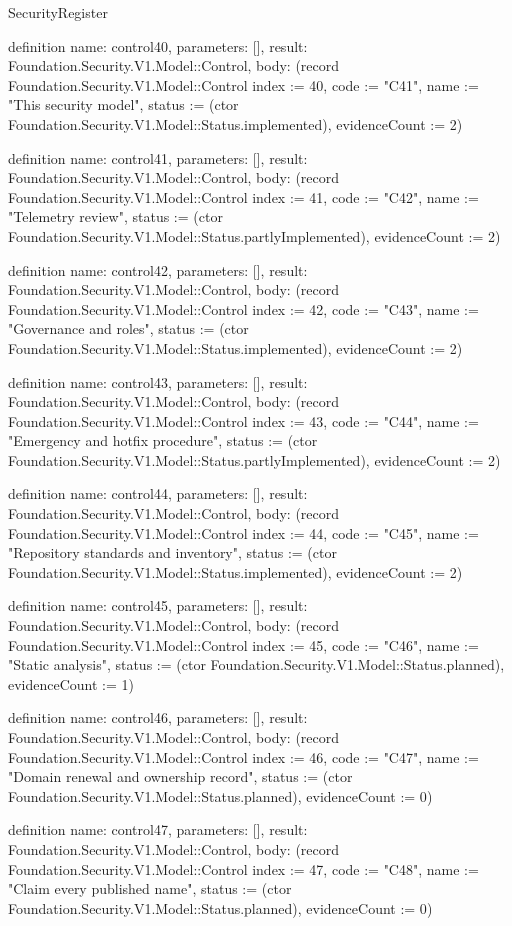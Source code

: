 \begin{lexlean}{SecurityRegister}
\begin{semanticmodule}
definition{
  name: control40,
  parameters: [],
  result: Foundation.Security.V1.Model::Control,
  body: (record Foundation.Security.V1.Model::Control {index := 40, code := "C41", name := "This security model", status := (ctor Foundation.Security.V1.Model::Status.implemented), evidenceCount := 2})
}

definition{
  name: control41,
  parameters: [],
  result: Foundation.Security.V1.Model::Control,
  body: (record Foundation.Security.V1.Model::Control {index := 41, code := "C42", name := "Telemetry review", status := (ctor Foundation.Security.V1.Model::Status.partlyImplemented), evidenceCount := 2})
}

definition{
  name: control42,
  parameters: [],
  result: Foundation.Security.V1.Model::Control,
  body: (record Foundation.Security.V1.Model::Control {index := 42, code := "C43", name := "Governance and roles", status := (ctor Foundation.Security.V1.Model::Status.implemented), evidenceCount := 2})
}

definition{
  name: control43,
  parameters: [],
  result: Foundation.Security.V1.Model::Control,
  body: (record Foundation.Security.V1.Model::Control {index := 43, code := "C44", name := "Emergency and hotfix procedure", status := (ctor Foundation.Security.V1.Model::Status.partlyImplemented), evidenceCount := 2})
}

definition{
  name: control44,
  parameters: [],
  result: Foundation.Security.V1.Model::Control,
  body: (record Foundation.Security.V1.Model::Control {index := 44, code := "C45", name := "Repository standards and inventory", status := (ctor Foundation.Security.V1.Model::Status.implemented), evidenceCount := 2})
}

definition{
  name: control45,
  parameters: [],
  result: Foundation.Security.V1.Model::Control,
  body: (record Foundation.Security.V1.Model::Control {index := 45, code := "C46", name := "Static analysis", status := (ctor Foundation.Security.V1.Model::Status.planned), evidenceCount := 1})
}

definition{
  name: control46,
  parameters: [],
  result: Foundation.Security.V1.Model::Control,
  body: (record Foundation.Security.V1.Model::Control {index := 46, code := "C47", name := "Domain renewal and ownership record", status := (ctor Foundation.Security.V1.Model::Status.planned), evidenceCount := 0})
}

definition{
  name: control47,
  parameters: [],
  result: Foundation.Security.V1.Model::Control,
  body: (record Foundation.Security.V1.Model::Control {index := 47, code := "C48", name := "Claim every published name", status := (ctor Foundation.Security.V1.Model::Status.planned), evidenceCount := 0})
}


\end{semanticmodule}
\end{lexlean}
